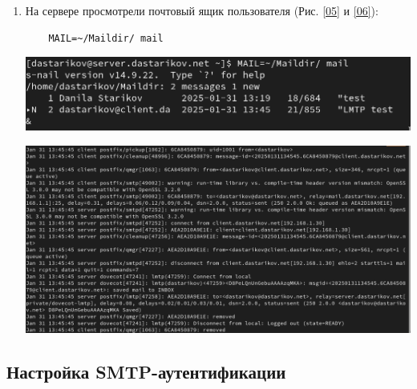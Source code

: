 \begin{enumerate}
\item На сервере просмотрели почтовый ящик пользователя  (Рис. \ref{05} и \ref{06}):
  \begin{verbatim}
    MAIL=~/Maildir/ mail
  \end{verbatim}
\begin{center}
    \centering
    \includegraphics[width=\textwidth]{../images/image05.png}
    \label{05}
\end{center}
\begin{center}
    \centering
    \includegraphics[width=\textwidth]{../images/image06.png}
    \label{06}
\end{center}
\end{enumerate}
\subsection{Настройка SMTP-аутентификации}

